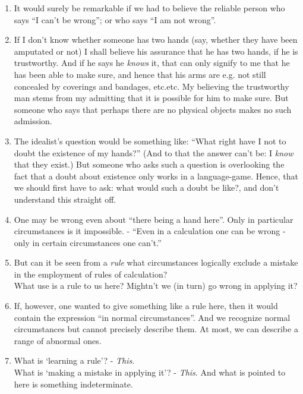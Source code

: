 \documentclass{book}
\begin{document}
\begin{enumerate}
\item
It would surely be remarkable if we had to believe the reliable person who says
``I can't be wrong''; or who says ``I am not wrong''.

\item
If I don't know whether someone has two hands (say, whether they have been
amputated or not) I shall believe his assurance that he has two hands, if he is
trustworthy. And if he says he \emph{knows} it, that can only signify to me
that he has been able to make sure, and hence that his arms are e.g. not still
concealed by coverings and bandages, etc.etc. My believing the trustworthy man
stems from my admitting that it is possible for him to make sure. But someone
who says that perhaps there are no physical objects makes no such admission.

\item
The idealist's question would be something like: ``What right have I not to
doubt the existence of my hands?'' (And to that the answer can't be: I
\emph{know} that they exist.) But someone who asks such a question is
overlooking the fact that a doubt about existence only works in a
language-game. Hence, that we should first have to ask: what would such a doubt
be like?, and don't understand this straight off.

\item
One may be wrong even about ``there being a hand here''. Only in particular
circumstances is it impossible. - ``Even in a calculation one can be wrong -
only in certain circumstances one can't.''

\item
But can it be seen from a \emph{rule} what circumstances logically exclude a
mistake in the employment of rules of calculation? \\
What use is a rule to us here?  Mightn't we (in turn) go wrong in applying it?

\item
If, however, one wanted to give something like a rule here, then it would
contain the expression ``in normal circumstances''. And we recognize normal
circumstances but cannot precisely describe them. At most, we can describe a
range of abnormal ones.

\item
What is `learning a rule'? - \emph{This}. \\
What is `making a mistake in applying it'? - \emph{This}. And what is pointed
to here is something indeterminate.


\end{enumerate}
\end{document}
